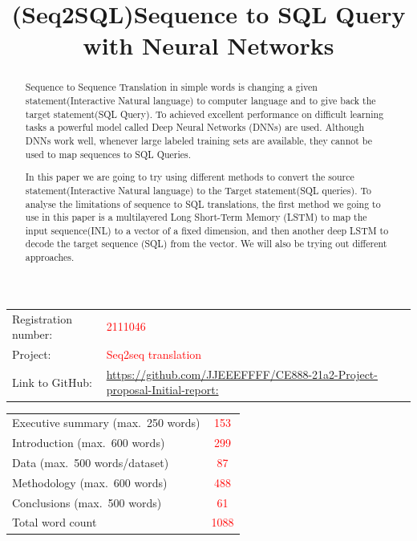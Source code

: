 \documentclass{article}
\title{(Seq2SQL)Sequence to SQL Query with Neural Networks}
\begin{document}
\maketitle

\begin{table}[h]
    \centering
    \begin{tabular}{ll}
        Registration number: & \textcolor{red}{2111046}\\
        Project: & \textcolor{red}{Seq2seq translation}\\
        Link to GitHub: & \url{https://github.com/JJEEEFFFF/CE888-21a2-Project-proposal-Initial-report:}\\
    \end{tabular}
\end{table}



\begin{table}[h]
    \centering
    \begin{tabular}{lc}
        Executive summary (max.\ 250 words) & \textcolor{red}{153}\\
        Introduction (max.\ 600 words) & \textcolor{red}{299}\\
        Data (max.\ 500 words/dataset) & \textcolor{red}{87}\\
        Methodology (max.\ 600 words) & \textcolor{red}{488}\\
        Conclusions (max.\ 500 words) & \textcolor{red}{61}\\
        \hline
        Total word count & \textcolor{red}{1088}\\
    \end{tabular}
\end{table}

\tableofcontents

\clearpage



\begin{abstract}
Sequence to Sequence Translation in simple words is changing a given statement(Interactive Natural language) to computer language and to give back the target statement(SQL Query). To achieved excellent performance on difficult learning tasks a powerful model called Deep Neural Networks (DNNs) are used. Although DNNs work well, whenever
large labeled training sets are available, they cannot be used to map sequences to
SQL Queries.

In this paper we are going to try using different methods to convert the source statement(Interactive Natural language) to the Target statement(SQL queries). To analyse the limitations of sequence to SQL translations, the first method we going to use in this paper is a multilayered Long Short-Term Memory (LSTM) to map the input sequence(INL)
to a vector of a fixed dimension, and then another deep LSTM to decode the
target sequence (SQL) from the vector. We will also be trying out different approaches.

\end{abstract}
\end{document}
